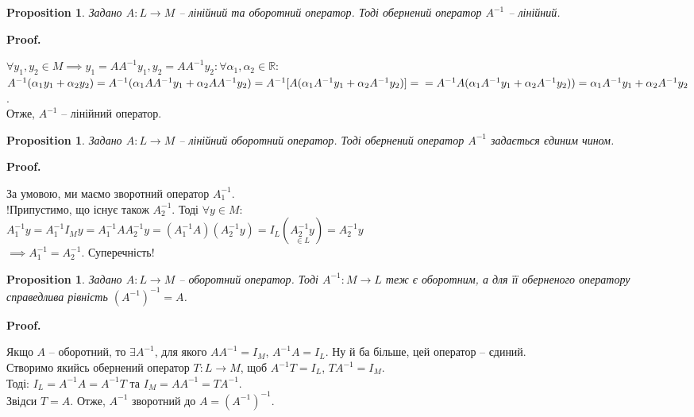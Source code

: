 \documentclass[a4paper, 10pt]{article}
\makeatletter
\theoremstyle{theoremdd}
\newtheorem{proposition}[theorem]{Proposition}
\renewenvironment{proof}[1][Proof.\\]{\par
\pushQED{\hfill \qed}%
\normalfont \topsep6\p@\@plus6\p@\relax
\trivlist
\item\relax
{\bfseries
#1\@addpunct{.}}\hspace\labelsep\ignorespaces
}{%
\popQED\endtrivlist\@endpefalse
}
\makeatother
\begin{document}
	\begin{proposition}
	Задано $A \colon L \to M$ -- лінійний та оборотний оператор. Тоді обернений оператор $A^{-1}$ -- лінійний.
	\end{proposition}
	
	\begin{proof}
	$\forall y_1, y_2 \in M \implies y_1 = AA^{-1}y_1, y_2 = AA^{-1}y_2: \forall \alpha_1, \alpha_2 \in \mathbb{R}:$\\
	$A^{-1}(\alpha_1 y_1 + \alpha_2 y_2) = A^{-1}(\alpha_1 AA^{-1}y_1 + \alpha_2 AA^{-1}y_2) = A^{-1}[A(\alpha_1 A^{-1}y_1 + \alpha_2 A^{-1}y_2)] = \\ = A^{-1}A(\alpha_1 A^{-1}y_1 + \alpha_2 A^{-1}y_2)) = \alpha_1 A^{-1}y_1 + \alpha_2 A^{-1}y_2$.\\
	Отже, $A^{-1}$ -- лінійний оператор.
	\end{proof}
	
	\begin{proposition}
	Задано $A \colon L \to M$ -- лінійний оборотний оператор. Тоді обернений оператор $A^{-1}$ задається єдиним чином.
	\end{proposition}
	
	\begin{proof}
	За умовою, ми маємо зворотний оператор $A_1^{-1}$.\\
	!Припустимо, що існує також $A^{-1}_2$. Тоді $\forall y \in M:$\\
	$A^{-1}_1 y = A^{-1}_1 I_M y = A^{-1}_1 A A^{-1}_2 y = (A^{-1}_1 A) (A^{-1}_2 y) = I_L (\underset{\in L}{A^{-1}_2 y}) = A_2^{-1}y$\\
	$\implies A^{-1}_1 = A^{-1}_2$. Суперечність!
	\end{proof}
	
	\begin{proposition}
	Задано $A \colon L \to M$ -- оборотний оператор. Тоді $A^{-1} \colon M \to L$ теж є оборотним, а для її оберненого оператору справедлива рівність $(A^{-1})^{-1} = A$.
	\end{proposition}
	
	\begin{proof}
	Якщо $A$ -- оборотний, то $\exists A^{-1}$, для якого $AA^{-1} = I_M$, $A^{-1}A = I_L$. Ну й ба більше, цей оператор -- єдиний.\\
	Створимо якийсь обернений оператор $T: L \to M$, щоб $A^{-1}T = I_L$, $TA^{-1} = I_M$.\\
	Тоді: $I_L = A^{-1}A = A^{-1}T$ та $I_M = AA^{-1} = TA^{-1}$.\\
	Звідси $T = A$. Отже, $A^{-1}$ зворотний до $A = (A^{-1})^{-1}$.
	\end{proof}
	
\end{document}
